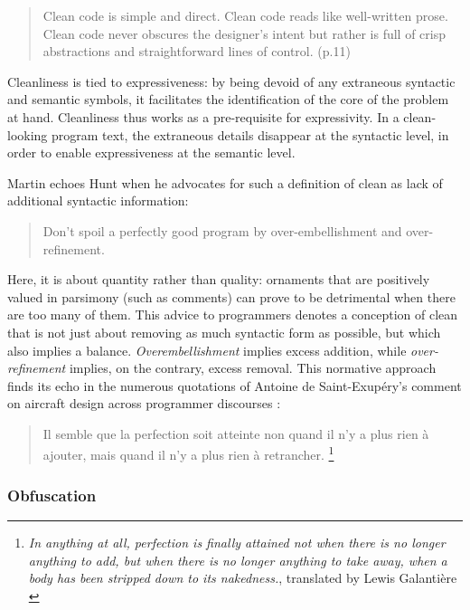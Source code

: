 \begin{quote}
  Clean code is simple and direct. Clean code reads like well-written prose. Clean code never obscures the designer's intent but rather is full of crisp abstractions and straightforward lines of control. \citep{martin_clean_2008} (p.11)
\end{quote}

Cleanliness is tied to expressiveness: by being devoid of any extraneous syntactic and semantic symbols, it facilitates the identification of the core of the problem at hand. Cleanliness thus works as a pre-requisite for expressivity. In a clean-looking program text, the extraneous details disappear at the syntactic level, in order to enable expressiveness at the semantic level.

Martin echoes Hunt when he advocates for such a definition of clean as lack of additional syntactic information:

\begin{quote}
  Don't spoil a perfectly good program by over-embellishment and over-refinement. \citep{hunt_pragmatic_1999}
\end{quote}

Here, it is about quantity rather than quality: ornaments that are positively valued in parsimony (such as comments) can prove to be detrimental when there are too many of them. This advice to programmers denotes a conception of clean that is not just about removing as much syntactic form as possible, but which also implies a balance. \emph{Overembellishment} implies excess addition, while \emph{over-refinement} implies, on the contrary, excess removal. This normative approach finds its echo in the numerous quotations of Antoine de Saint-Exupéry's comment on aircraft design across programmer discourses \citep{programmingwisdom[codewisdom]_designer_2021,jackson_perfection_2010,jargonfile4.4.7_elegant_2003}:

\begin{quote}
  Il semble que la perfection soit atteinte non quand il n'y a plus rien à ajouter, mais quand il n'y a plus rien à retrancher.  \citep{desaint-exupery_terre_1972}\footnote{\emph{ In anything at all, perfection is finally attained not when there is no longer anything to add, but when there is no longer anything to take away, when a body has been stripped down to its nakedness.}, translated by Lewis Galantière \citep{saint-exupery_wind_1990}}
\end{quote}

\subsubsection{Obfuscation}
\label{subsubsec:obfuscation}

